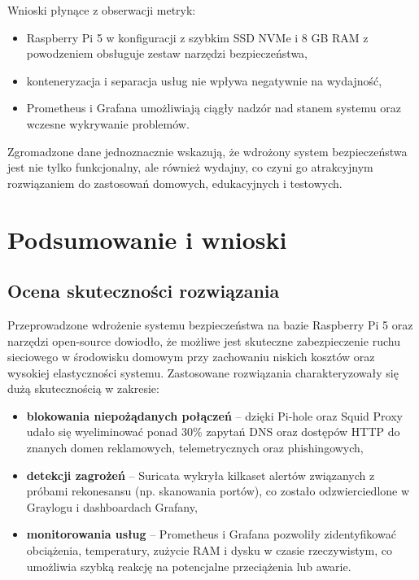 \documentclass[
    left=2.5cm,         %
    right=2.5cm,        %
    top=2.5cm,          %
    bottom=3cm,         %
    bindingoffset=6mm,  %
    nohyphenation=true %
]{eiti/eiti-thesis} %
\begin{document}
Wnioski płynące z obserwacji metryk:
\begin{itemize}
    \item Raspberry Pi 5 w konfiguracji z szybkim SSD NVMe i 8 GB RAM z powodzeniem obsługuje zestaw narzędzi bezpieczeństwa,
    \item konteneryzacja i separacja usług nie wpływa negatywnie na wydajność,
    \item Prometheus i Grafana umożliwiają ciągły nadzór nad stanem systemu oraz wczesne wykrywanie problemów.
\end{itemize}

Zgromadzone dane jednoznacznie wskazują, że wdrożony system bezpieczeństwa jest nie tylko funkcjonalny, ale również wydajny, co czyni go atrakcyjnym rozwiązaniem do zastosowań domowych, edukacyjnych i testowych.

\newpage 
\section{Podsumowanie i wnioski}

\subsection{Ocena skuteczności rozwiązania}

Przeprowadzone wdrożenie systemu bezpieczeństwa na bazie Raspberry Pi 5 oraz narzędzi open-source dowiodło, że możliwe jest skuteczne zabezpieczenie ruchu sieciowego w środowisku domowym przy zachowaniu niskich kosztów oraz wysokiej elastyczności systemu. Zastosowane rozwiązania charakteryzowały się dużą skutecznością w zakresie:
\begin{itemize}
    \item \textbf{blokowania niepożądanych połączeń} – dzięki Pi-hole oraz Squid Proxy udało się wyeliminować ponad 30\% zapytań DNS oraz dostępów HTTP do znanych domen reklamowych, telemetrycznych oraz phishingowych,
    \item \textbf{detekcji zagrożeń} – Suricata wykryła kilkaset alertów związanych z próbami rekonesansu (np. skanowania portów), co zostało odzwierciedlone w Graylogu i dashboardach Grafany,
    \item \textbf{monitorowania usług} – Prometheus i Grafana pozwoliły zidentyfikować obciążenia, temperatury, zużycie RAM i dysku w czasie rzeczywistym, co umożliwia szybką reakcję na potencjalne przeciążenia lub awarie.
\end{itemize}
\end{document}
